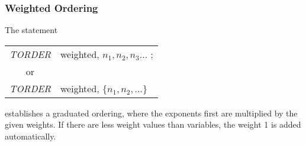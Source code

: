 \subsubsection{Weighted Ordering}
 
The statement
\begin{center}
\begin{tabular}{cl}
{\it TORDER} & weighted, $n_1,n_2,n_3 \ldots$ ; \\
or \\
{\it TORDER} & weighted, $\{n_1,n_2,\ldots\}$
\end{tabular}
\end{center}
establishes a graduated ordering, where the exponents first are
multiplied by the given weights. If there are less weight values than
variables, the weight 1 is added automatically.

